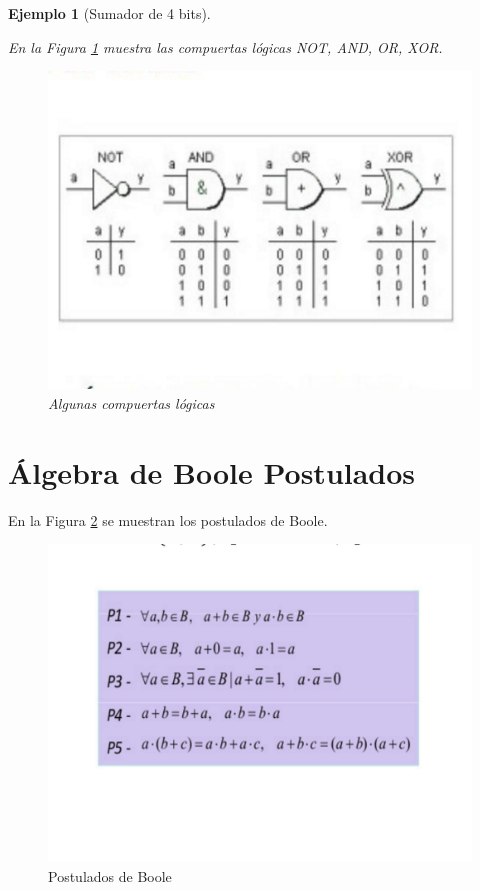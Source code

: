 \documentclass[12pt,letterpaper]{book}
\newtheorem{example}{Ejemplo}
\begin{document}
\begin{example}[Sumador de 4 bits]
\begin{multicols}{2}
En la Figura \ref{ejeSum3} muestra las compuertas lógicas NOT, AND, OR, XOR.

\begin{figure}[H]
\centering
\includegraphics[width=1\linewidth]{figures/ejeSum3.png}
\caption{Algunas compuertas lógicas}
\label{ejeSum3}
\end{figure}
\vspace{0.2cm}
\end{multicols}
\end{example}

\section{Álgebra de Boole Postulados}

En la Figura \ref{proBoo} se muestran los postulados de Boole. 

\begin{figure}[H]
\centering
\includegraphics[width=1\linewidth]{figures/proBoo.png}
\caption{Postulados de Boole}
\label{proBoo}
\end{figure}
\vspace{0.2cm}
\end{document}
